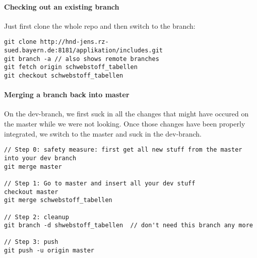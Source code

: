 \paragraph{Checking out an existing branch} Just first clone the whole repo and then switch to the branch: 

\begin{lstlisting}
git clone http://hnd-jens.rz-sued.bayern.de:8181/applikation/includes.git
git branch -a // also shows remote branches
git fetch origin schwebstoff_tabellen
git checkout schwebstoff_tabellen
\end{lstlisting}


\paragraph{Merging a branch back into master} On the dev-branch, we first suck in all the changes that might have occured on the master while we were not looking. Once those changes have been properly integrated, we switch to the master and suck in the dev-branch.

\begin{lstlisting}
// Step 0: safety measure: first get all new stuff from the master into your dev branch
git merge master 

// Step 1: Go to master and insert all your dev stuff 
checkout master
git merge schwebstoff_tabellen

// Step 2: cleanup
git branch -d shwebstoff_tabellen  // don't need this branch any more

// Step 3: push
git push -u origin master
\end{lstlisting}


